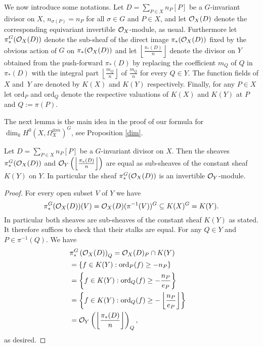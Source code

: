 We now introduce some notations. 
Let $D=\sum_{P\in X}n_P[P]$ be a $G$-invariant divisor on $X$, \ie $n_{\sigma(P)} = n_P$ for all $\sigma \in G$ and $P\in X$, and let ${\cal O}_X(D)$ denote the corresponding equivariant invertible ${\cal O}_X$-module, as usual. 
Furthermore let $\pi_*^G({\cal O}_X(D))$ denote the sub-sheaf of the direct image $\pi_*({\cal O}_X(D))$ fixed by the obvious action of $G$ on $\pi_*({\cal O}_X(D))$ and let $\left\lfloor \frac{\pi_*(D)}{n}
\right \rfloor$ denote the divisor on $Y$ obtained from the push-forward $\pi_*(D)$ by replacing the coefficient $m_Q$ of $Q$ in $\pi_*(D)$ with the integral part $\left \lfloor \frac{m_Q}{n} \right \rfloor$ of $\frac{m_Q}{n}$ for every $Q \in Y$. 
The function fields of $X$ and~$Y$ are denoted by $K(X)$ and $K(Y)$ respectively. 
Finally, for any $P \in X$ let $\textrm{ord}_P$ and $\textrm{ord}_Q$ denote the respective valuations of $K(X)$ and $K(Y)$ at $P$ and $Q:=\pi(P)$.



The next lemma is the main idea in the proof of our formula for $\dim_kH^0(X,\Omega_X^{\otimes m})^G$, see Proposition \ref{dim}. 



\begin{lem}
Let $D=\sum_{P\in X}n_P[P]$ be a $G$-invariant divisor on $X$.
Then the sheaves $\pi_*^G({\cal O}_X(D))$ and ${\cal O}_Y\left(\left\lfloor \frac{\pi_*(D)}{n}\right \rfloor\right)$ are equal as sub-sheaves of the constant sheaf $K(Y)$ on $Y$. 
In particular the sheaf $\pi_*^G({\cal O}_X(D))$ is an invertible ${\cal O}_Y$-module.
\end{lem}
\begin{proof}
For every open subset $V$ of $Y$ we have 
\[
\pi_*^G({\cal O}_X(D))(V) = {\cal O}_X(D) (\pi^{-1}(V))^G \subseteq K(X)^G = K(Y).
\]
In particular both sheaves are sub-sheaves of the constant sheaf $K(Y)$ as stated. 
It therefore suffices to check that their stalks are equal. 
For any $Q \in Y$ and $P \in \pi^{-1}(Q)$.
We have
\begin{align*}
\lefteqn{\pi_*^G\left(\cO_X(D)\right)_Q = \cO_X(D)_P \cap K(Y)}\\
&= \left\{f \in K(Y): \textrm{ord}_P(f) \ge -n_P\right\}\\
&= \left\{f \in K(Y): \textrm{ord}_Q(f) \ge - \frac{n_P}{e_P}\right\}\\
&= \left\{ f \in K(Y): \textrm{ord}_Q(f) \ge - \left\lfloor\frac{n_P}{e_P} \right\rfloor \right\}\\
&= \cO_Y\left(\left\lfloor \frac{\pi_*(D)}{n} \right\rfloor\right)_Q,
\end{align*}
as desired.
\end{proof}


